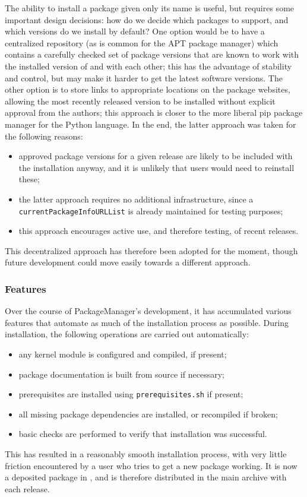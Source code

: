 \documentclass{deliverablereport}
\begin{document}
The ability to install a package given only its name is useful, but requires
some important design decisions: how do we decide which packages to support, and
which versions do we install by default?  One option would be to have a
centralized repository (as is common for the {\sf APT} package manager) which
contains a carefully checked set of package versions that are known to work with
the installed version of \GAP and with each other; this has the advantage of
stability and control, but may make it harder to get the latest software
versions.  The other option is to store links to appropriate locations on the
package websites, allowing the most recently released version to be installed
without explicit approval from the \GAP authors; this approach is closer to the
more liberal {\sf pip} package manager for the Python language.
In the end, the latter approach was taken for the following reasons:
\begin{itemize}
\item approved package versions for a given release are likely to be included
  with the \GAP installation anyway, and it is unlikely that users would need
  to reinstall these;
\item the latter approach requires no additional infrastructure, since a
  \texttt{currentPackageInfoURLList} is already maintained for testing purposes;
\item this approach encourages active use, and therefore testing, of recent releases.
\end{itemize}
This decentralized approach has therefore been adopted for the moment, though
future development could move easily towards a different approach.

\subsubsection{Features}

Over the course of {\sf PackageManager}'s development, it has accumulated
various features that automate as much of the installation process as possible.
During installation, the following operations are carried out automatically:
\begin{itemize}
\item any kernel module is configured and compiled, if present;
\item package documentation is built from source if necessary;
\item prerequisites are installed using \texttt{prerequisites.sh} if present;
\item all missing package dependencies are installed, or recompiled if broken;
\item basic checks are performed to verify that installation was successful.
\end{itemize}
This has resulted in a reasonably smooth installation process, with very little
friction encountered by a user who tries to get a new package working.  It is
now a deposited package in \GAP, and is therefore distributed in the main
archive with each release.
\end{document}
